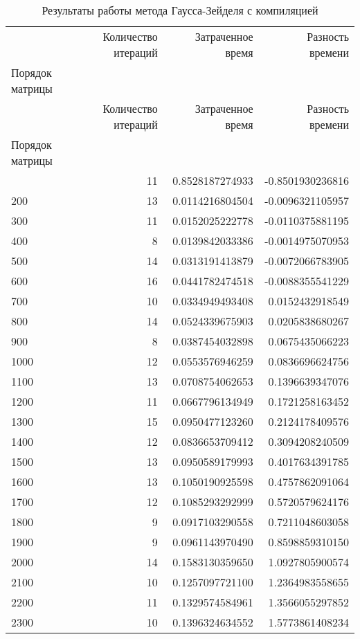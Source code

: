 \begin{longtable}{lrrr}
\caption{Результаты работы метода Гаусса-Зейделя с компиляцией}\\
\toprule
 & Количество итераций & Затраченное время & Разность времени \\
Порядок матрицы &  &  &  \\
\midrule
\endfirsthead
\toprule
 & Количество итераций & Затраченное время & Разность времени \\
Порядок матрицы &  &  &  \\
\midrule
\endhead
\midrule
\midrule
\endfoot
\bottomrule
\endlastfoot
100 & 11 & 0.8528187274933 & -0.8501930236816 \\
200 & 13 & 0.0114216804504 & -0.0096321105957 \\
300 & 11 & 0.0152025222778 & -0.0110375881195 \\
400 & 8 & 0.0139842033386 & -0.0014975070953 \\
500 & 14 & 0.0313191413879 & -0.0072066783905 \\
600 & 16 & 0.0441782474518 & -0.0088355541229 \\
700 & 10 & 0.0334949493408 & 0.0152432918549 \\
800 & 14 & 0.0524339675903 & 0.0205838680267 \\
900 & 8 & 0.0387454032898 & 0.0675435066223 \\
1000 & 12 & 0.0553576946259 & 0.0836696624756 \\
1100 & 13 & 0.0708754062653 & 0.1396639347076 \\
1200 & 11 & 0.0667796134949 & 0.1721258163452 \\
1300 & 15 & 0.0950477123260 & 0.2124178409576 \\
1400 & 12 & 0.0836653709412 & 0.3094208240509 \\
1500 & 13 & 0.0950589179993 & 0.4017634391785 \\
1600 & 13 & 0.1050190925598 & 0.4757862091064 \\
1700 & 12 & 0.1085293292999 & 0.5720579624176 \\
1800 & 9 & 0.0917103290558 & 0.7211048603058 \\
1900 & 9 & 0.0961143970490 & 0.8598859310150 \\
2000 & 14 & 0.1583130359650 & 1.0927805900574 \\
2100 & 10 & 0.1257097721100 & 1.2364983558655 \\
2200 & 11 & 0.1329574584961 & 1.3566055297852 \\
2300 & 10 & 0.1396324634552 & 1.5773861408234 \\

\end{longtable}
